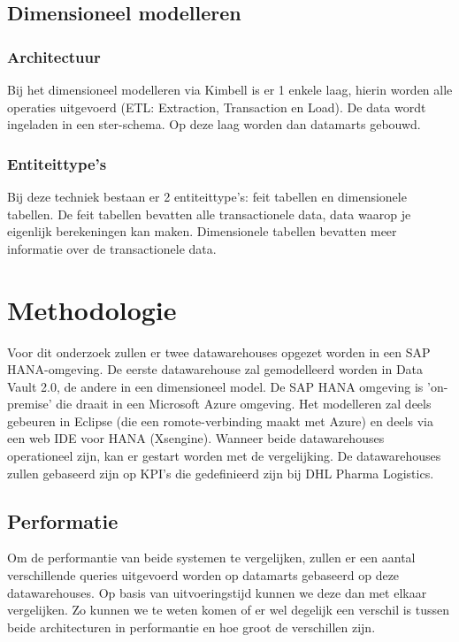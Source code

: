 \subsection{Dimensioneel modelleren}
\subsubsection{Architectuur}
Bij het dimensioneel modelleren via Kimbell is er 1 enkele laag, hierin worden alle operaties uitgevoerd (ETL: Extraction, Transaction en Load). De data wordt ingeladen in een ster-schema. Op deze laag worden dan datamarts gebouwd. \autocite{Jukic2006}

\subsubsection{Entiteittype's}
Bij deze techniek bestaan er 2 entiteittype's: feit tabellen en dimensionele tabellen. De feit tabellen bevatten alle transactionele data, data waarop je eigenlijk berekeningen kan maken. Dimensionele tabellen bevatten meer informatie over de transactionele data.



\section{Methodologie}
\label{sec:methodologie}
Voor dit onderzoek zullen er twee datawarehouses opgezet worden in een SAP HANA-omgeving. De eerste datawarehouse zal gemodelleerd worden in Data Vault 2.0, de andere in een dimensioneel model. De SAP HANA omgeving is 'on-premise' die draait in een Microsoft Azure omgeving. Het modelleren zal deels gebeuren in Eclipse (die een romote-verbinding maakt met Azure) en deels via een web IDE voor HANA (Xsengine). Wanneer beide datawarehouses operationeel zijn, kan er gestart worden met de vergelijking. De datawarehouses zullen gebaseerd zijn op KPI's die gedefinieerd zijn bij DHL Pharma Logistics.

\subsection{Performatie}
Om de performantie van beide systemen te vergelijken, zullen er een aantal verschillende queries uitgevoerd worden op datamarts gebaseerd op deze datawarehouses. Op basis van uitvoeringstijd kunnen we deze dan met elkaar vergelijken. Zo kunnen we te weten komen of er wel degelijk een verschil is tussen beide architecturen in performantie en hoe groot de verschillen zijn. 

